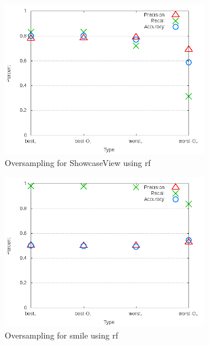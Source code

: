 \begin{figure}[!t]
\centering
\includegraphics[width=0.8\textwidth]{images/rf/test_4/ShowcaseView_sample_range.png}
\caption{Oversampling for ShowcaseView using \gls{rf}}
\label{fig:test_4_ShowcaseView_rf}
\end{figure}

\begin{figure}[!t]
\centering
\includegraphics[width=0.8\textwidth]{images/rf/test_4/smile_sample_range.png}
\caption{Oversampling for smile using \gls{rf}}
\label{fig:test_4_smile_rf}
\end{figure}

